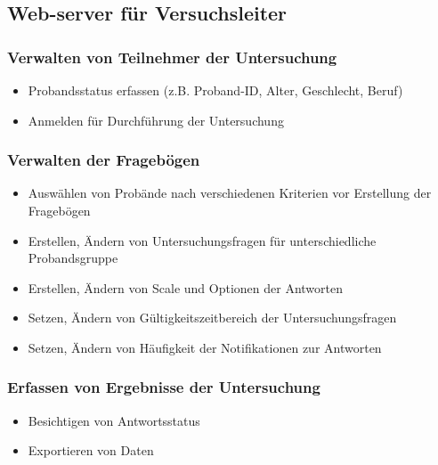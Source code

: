 \documentclass[a4paper]{scrreprt}
\begin{document}
            \subsection{Web-server f\"ur Versuchsleiter}
                \vspace*{0.2cm}

                \subsubsection{Verwalten von Teilnehmer der Untersuchung}
                    \begin{itemize}
                        \item Probandsstatus erfassen (z.B. Proband-ID, Alter, Geschlecht, Beruf)
                        \item Anmelden f\"ur Durchf\"uhrung der Untersuchung
                    \end{itemize}
            
                \subsubsection{Verwalten der Frageb\"ogen}
                    \begin{itemize}
                        \item Ausw\"ahlen von Prob\"ande nach verschiedenen Kriterien vor Erstellung der Frageb\"ogen
                        \item Erstellen, \"Andern von Untersuchungsfragen f\"ur unterschiedliche Probandsgruppe
                        \item Erstellen, \"Andern von Scale und Optionen der Antworten
                        \item Setzen, \"Andern von G\"ultigkeitszeitbereich der Untersuchungsfragen
                        \item Setzen, \"Andern von H\"aufigkeit der Notifikationen zur Antworten
                    \end{itemize}

                \subsubsection{Erfassen von Ergebnisse der Untersuchung}
                    \begin{itemize}
                        \item Besichtigen von Antwortsstatus
                        \item Exportieren von Daten  
                    \end{itemize}
            \vspace*{2cm}
\end{document}
